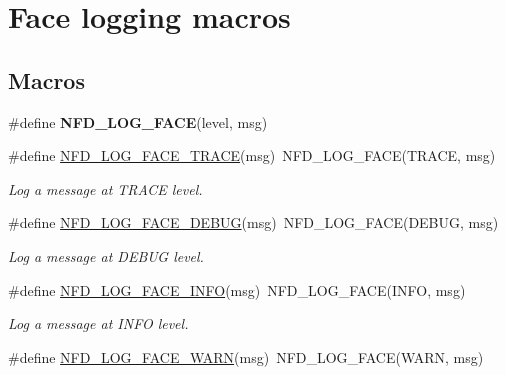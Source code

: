 \hypertarget{group__FaceLogging}{}\section{Face logging macros}
\label{group__FaceLogging}
\subsection*{Macros}
\begin{DoxyCompactItemize}
\item 
\#define {\bfseries N\+F\+D\+\_\+\+L\+O\+G\+\_\+\+F\+A\+CE}(level,  msg)
\item 
\#define \hyperlink{group__FaceLogging_gad77782189cee6e6c849c2152b81d5133}{N\+F\+D\+\_\+\+L\+O\+G\+\_\+\+F\+A\+C\+E\+\_\+\+T\+R\+A\+CE}(msg)~N\+F\+D\+\_\+\+L\+O\+G\+\_\+\+F\+A\+CE(T\+R\+A\+CE, msg)\hypertarget{group__FaceLogging_gad77782189cee6e6c849c2152b81d5133}{}\label{group__FaceLogging_gad77782189cee6e6c849c2152b81d5133}

\begin{DoxyCompactList}\small\item\em Log a message at T\+R\+A\+CE level. \end{DoxyCompactList}\item 
\#define \hyperlink{group__FaceLogging_ga1e53e9db0225b9afeefe75d787a9d493}{N\+F\+D\+\_\+\+L\+O\+G\+\_\+\+F\+A\+C\+E\+\_\+\+D\+E\+B\+UG}(msg)~N\+F\+D\+\_\+\+L\+O\+G\+\_\+\+F\+A\+CE(D\+E\+B\+UG, msg)\hypertarget{group__FaceLogging_ga1e53e9db0225b9afeefe75d787a9d493}{}\label{group__FaceLogging_ga1e53e9db0225b9afeefe75d787a9d493}

\begin{DoxyCompactList}\small\item\em Log a message at D\+E\+B\+UG level. \end{DoxyCompactList}\item 
\#define \hyperlink{group__FaceLogging_ga5a42b1131b733c22e2e595643dc53047}{N\+F\+D\+\_\+\+L\+O\+G\+\_\+\+F\+A\+C\+E\+\_\+\+I\+N\+FO}(msg)~N\+F\+D\+\_\+\+L\+O\+G\+\_\+\+F\+A\+CE(I\+N\+FO,  msg)\hypertarget{group__FaceLogging_ga5a42b1131b733c22e2e595643dc53047}{}\label{group__FaceLogging_ga5a42b1131b733c22e2e595643dc53047}

\begin{DoxyCompactList}\small\item\em Log a message at I\+N\+FO level. \end{DoxyCompactList}\item 
\#define \hyperlink{group__FaceLogging_gad32c95f0ac1b6e4fbfd77c48a311caa5}{N\+F\+D\+\_\+\+L\+O\+G\+\_\+\+F\+A\+C\+E\+\_\+\+W\+A\+RN}(msg)~N\+F\+D\+\_\+\+L\+O\+G\+\_\+\+F\+A\+CE(W\+A\+RN,  msg)\hypertarget{group__FaceLogging_gad32c95f0ac1b6e4fbfd77c48a311caa5}{}\label{group__FaceLogging_gad32c95f0ac1b6e4fbfd77c48a311caa5}


\end{DoxyCompactItemize}
